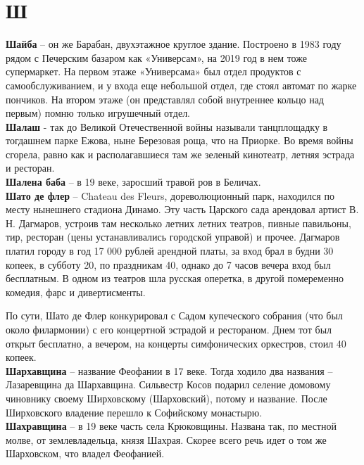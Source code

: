 \chapter*{Ш}

\textbf{Шайба} – он же Барабан, двухэтажное круглое здание. Построено в 1983 году рядом с Печерским базаром как «Универсам», на 2019 год в нем тоже супермаркет. На первом этаже «Универсама» был отдел продуктов с самообслуживанием, и у входа еще небольшой отдел, где стоял автомат по жарке пончиков. На втором этаже (он представлял собой внутреннее кольцо над первым) помню только игрушечный отдел.\\

\textbf{Шалаш} - так до Великой Отечественной войны называли танцплощадку в тогдашнем парке Ежова, ныне Березовая роща, что на Приорке. Во время войны сгорела, равно как и располагавшиеся там же зеленый кинотеатр, летняя эстрада и ресторан.\\

\textbf{Шалена баба} – в 19 веке, заросший травой ров в Беличах.\\

\textbf{Шато де флер} – Chateau des Fleurs, дореволюционный парк, находился по месту нынешнего стадиона Динамо. Эту часть Царского сада арендовал артист В. Н. Дагмаров, устроив там несколько летних летних театров, пивные павильоны, тир, ресторан (цены устанавливались городской управой) и прочее. Дагмаров платил городу в год 17 000 рублей арендной платы, за вход брал в будни 30 копеек, в субботу 20, по праздникам 40, однако до 7 часов вечера вход был бесплатным. В одном из театров шла русская оперетка, в другой помеременно комедия, фарс и дивертисменты.

По сути, Шато де Флер конкурировал с Садом купеческого собрания (что был около филармонии) с его концертной эстрадой и рестораном. Днем тот был открыт бесплатно, а вечером, на концерты симфонических оркестров, стоил 40 копеек.\\ 

\textbf{Шархавщина} – название Феофании в 17 веке. Тогда ходило два названия – Лазаревщина да Шархавщина. Сильвестр Косов подарил селение домовому чиновнику своему Ширховскому (Шарховский), потому и название. После Ширховского владение перешло к Софийскому монастырю.\\

\textbf{Шахравщина} – в 19 веке часть села Крюковщины. Названа так, по местной молве, от землевладельца, князя Шахрая. Скорее всего речь идет о том же Шарховском, что владел Феофанией.\\

